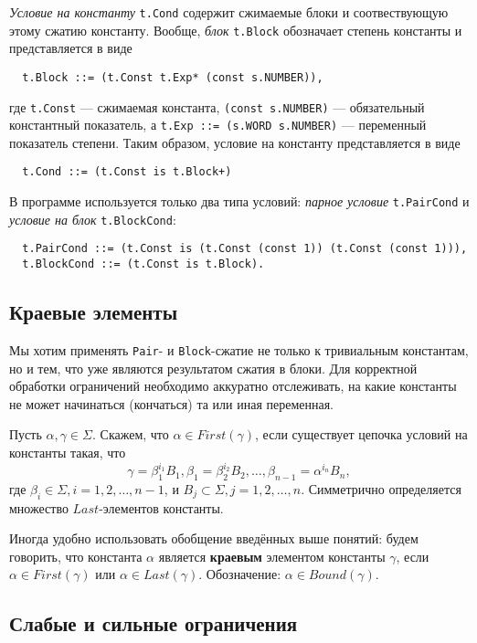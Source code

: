 \documentclass[12pt]{article}
\begin{document}
\textit{Условие на константу} \texttt{t.Cond} содержит сжимаемые блоки и
соотвествующую этому сжатию константу. Вообще, \textit{блок} \texttt{t.Block}
обозначает степень константы и представляется в виде
\begin{Verbatim}
  t.Block ::= (t.Const t.Exp* (const s.NUMBER)),
\end{Verbatim}
где \texttt{t.Const} --- сжимаемая константа, \texttt{(const s.NUMBER)} ---
обязательный константный показатель, а \texttt{t.Exp ::= (s.WORD s.NUMBER)}
--- переменный показатель степени. Таким образом, условие на константу
представляется в виде
\begin{Verbatim}
  t.Cond ::= (t.Const is t.Block+)
\end{Verbatim}
В программе используется только два типа условий: \textit{парное условие}
\texttt{t.PairCond} и \textit{условие на блок} \texttt{t.BlockCond}:
\begin{Verbatim}
  t.PairCond ::= (t.Const is (t.Const (const 1)) (t.Const (const 1))),
  t.BlockCond ::= (t.Const is t.Block).
\end{Verbatim}

\subsection{Краевые элементы}

Мы хотим применять \texttt{Pair}- и \texttt{Block}-сжатие не только к
тривиальным константам, но и тем, что уже являются результатом сжатия в блоки.
Для корректной обработки ограничений необходимо аккуратно отслеживать, на какие
константы не может начинаться (кончаться) та или иная переменная.

Пусть $\alpha, \gamma \in \Sigma$. Скажем, что $\alpha \in First(\gamma)$, если
существует цепочка условий на константы такая, что
\begin{displaymath}
  \gamma = \beta_1^{i_1} B_1,
  \beta_1 = \beta_2^{i_2} B_2,
  \dots,
  \beta_{n-1} = \alpha^{i_n} B_n,
\end{displaymath}
где $\beta_i \in \Sigma, i = 1, 2, \dots, n - 1$, и $B_j \subset \Sigma, j = 1,
2, \dots, n$. Симметрично определяется множество $Last$-элементов константы.

Иногда удобно использовать обобщение введённых выше понятий: будем
говорить, что константа $\alpha$ является \textbf{краевым} элементом константы
$\gamma$, если $\alpha \in First(\gamma)$ или $\alpha \in Last(\gamma)$.
Обозначение: $\alpha \in Bound(\gamma)$.

\subsection{Слабые и сильные ограничения}
\end{document}
